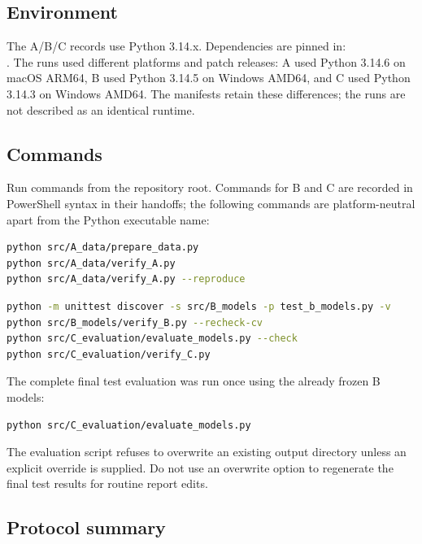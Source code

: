 \subsection{Environment}

The A/B/C records use Python 3.14.x. Dependencies are pinned in:\\
.
The runs used different platforms and patch releases: A used Python 3.14.6 on macOS ARM64, B used
Python 3.14.5 on Windows AMD64, and C used Python 3.14.3 on Windows AMD64. The manifests retain
these differences; the runs are not described as an identical runtime.

\subsection{Commands}

Run commands from the repository root. Commands for B and C are recorded in PowerShell syntax in
their handoffs; the following commands are platform-neutral apart from the Python executable
name:

\begin{lstlisting}[language=bash,caption={Data preparation and verification}]
python src/A_data/prepare_data.py
python src/A_data/verify_A.py
python src/A_data/verify_A.py --reproduce
\end{lstlisting}

\begin{lstlisting}[language=bash,caption={Model checks and final evaluation}]
python -m unittest discover -s src/B_models -p test_b_models.py -v
python src/B_models/verify_B.py --recheck-cv
python src/C_evaluation/evaluate_models.py --check
python src/C_evaluation/verify_C.py
\end{lstlisting}

The complete final test evaluation was run once using the already frozen B models:

\begin{lstlisting}[language=bash,caption={One-shot test evaluation; results already exist in this project}]
python src/C_evaluation/evaluate_models.py
\end{lstlisting}

The evaluation script refuses to overwrite an existing output directory unless an explicit
override is supplied. Do not use an overwrite option to regenerate the final test results for
routine report edits.

\subsection{Protocol summary}

